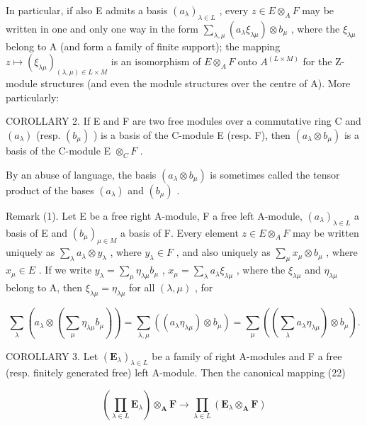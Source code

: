 In particular, if also E admits a basis \((a_{\lambda})_{\lambda \in L}\) , every \(z \in E \otimes_{A} F\) may be written in one and only one way in the form \(\sum_{\lambda, \mu} (a_{\lambda} \xi_{\lambda \mu}) \otimes b_{\mu}\) , where the \(\xi_{\lambda \mu}\) belong to A (and form a family of finite support); the mapping \(z \mapsto (\xi_{\lambda \mu})_{(\lambda, \mu) \in L \times M}\) is an isomorphism of \(E \otimes_{A} F\) onto \(A^{(L \times M)}\) for the Z-module structures (and even the module structures over the centre of A). More particularly:

COROLLARY 2. If E and F are two free modules over a commutative ring C and \((a_{\lambda})\) (resp. \((b_{\mu})\) ) is a basis of the C-module E (resp. F), then \((a_{\lambda} \otimes b_{\mu})\) is a basis of the C-module E \(\otimes_{C} F\) .

By an abuse of language, the basis \((a_{\lambda} \otimes b_{\mu})\) is sometimes called the tensor product of the bases \((a_{\lambda})\) and \((b_{\mu})\) .

Remark (1). Let E be a free right A-module, F a free left A-module, \((a_{\lambda})_{\lambda \in L}\) a basis of E and \((b_{\mu})_{\mu \in M}\) a basis of F. Every element \(z \in E \otimes_{A} F\) may be written uniquely as \(\sum_{\lambda} a_{\lambda} \otimes y_{\lambda}\) , where \(y_{\lambda} \in F\) , and also uniquely as \(\sum_{\mu} x_{\mu} \otimes b_{\mu}\) , where \(x_{\mu} \in E\) . If we write \(y_{\lambda} = \sum_{\mu} \eta_{\lambda \mu} b_{\mu}\) , \(x_{\mu} = \sum_{\lambda} a_{\lambda} \xi_{\lambda \mu}\) , where the \(\xi_{\lambda \mu}\) and \(\eta_{\lambda \mu}\) belong to A, then \(\xi_{\lambda \mu} = \eta_{\lambda \mu}\) for all \((\lambda, \mu)\) , for

\[
\sum_ {\lambda} \left(a _ {\lambda} \otimes \left(\sum_ {\mu} \eta_ {\lambda \mu} b _ {\mu}\right)\right) = \sum_ {\lambda , \mu} \left((a _ {\lambda} \eta_ {\lambda \mu}) \otimes b _ {\mu}\right) = \sum_ {\mu} \left(\left(\sum_ {\lambda} a _ {\lambda} \eta_ {\lambda \mu}\right) \otimes b _ {\mu}\right).
\]

COROLLARY 3. Let \((\mathbf{E}_{\lambda})_{\lambda \in L}\) be a family of right A-modules and F a free (resp. finitely generated free) left A-module. Then the canonical mapping (22)

\[
\left(\prod_ {\lambda \in L} \mathbf {E} _ {\lambda}\right) \otimes_ {\mathbf {A}} \mathbf {F} \rightarrow \prod_ {\lambda \in L} \left(\mathbf {E} _ {\lambda} \otimes_ {\mathbf {A}} \mathbf {F}\right)
\]

